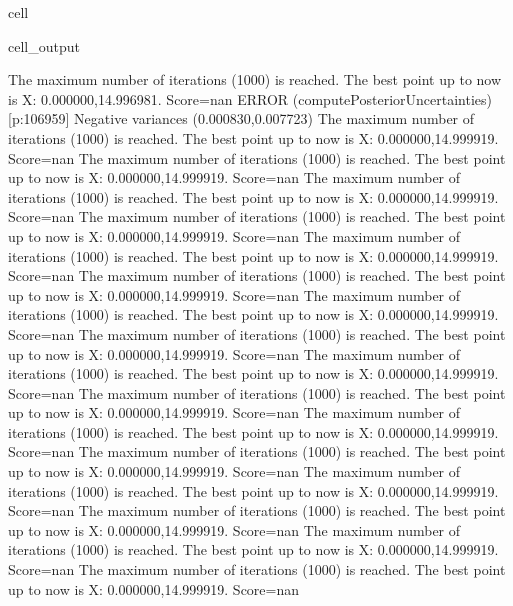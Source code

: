 \documentclass[letterpaper,10pt,english]{jupyterBook}
\begin{document}
\begin{sphinxuseclass}{cell}
\begin{sphinxVerbatimOutput}
\begin{sphinxuseclass}{cell_output}
\begin{sphinxVerbatim}[commandchars=\\\{\}]
The maximum number of iterations (1000) is reached. The best point up to now is X: \PYGZob{}0.000000,14.996981\PYGZcb{}. Score=\PYGZhy{}nan
ERROR (compute\PYGZus{}Posterior\PYGZus{}Uncertainties) [p:106959] Negative variances (\PYGZhy{}0.000830,0.007723)
The maximum number of iterations (1000) is reached. The best point up to now is X: \PYGZob{}0.000000,14.999919\PYGZcb{}. Score=\PYGZhy{}nan
The maximum number of iterations (1000) is reached. The best point up to now is X: \PYGZob{}0.000000,14.999919\PYGZcb{}. Score=\PYGZhy{}nan
The maximum number of iterations (1000) is reached. The best point up to now is X: \PYGZob{}0.000000,14.999919\PYGZcb{}. Score=\PYGZhy{}nan
The maximum number of iterations (1000) is reached. The best point up to now is X: \PYGZob{}0.000000,14.999919\PYGZcb{}. Score=\PYGZhy{}nan
The maximum number of iterations (1000) is reached. The best point up to now is X: \PYGZob{}0.000000,14.999919\PYGZcb{}. Score=\PYGZhy{}nan
The maximum number of iterations (1000) is reached. The best point up to now is X: \PYGZob{}0.000000,14.999919\PYGZcb{}. Score=\PYGZhy{}nan
The maximum number of iterations (1000) is reached. The best point up to now is X: \PYGZob{}0.000000,14.999919\PYGZcb{}. Score=\PYGZhy{}nan
The maximum number of iterations (1000) is reached. The best point up to now is X: \PYGZob{}0.000000,14.999919\PYGZcb{}. Score=\PYGZhy{}nan
The maximum number of iterations (1000) is reached. The best point up to now is X: \PYGZob{}0.000000,14.999919\PYGZcb{}. Score=\PYGZhy{}nan
The maximum number of iterations (1000) is reached. The best point up to now is X: \PYGZob{}0.000000,14.999919\PYGZcb{}. Score=\PYGZhy{}nan
The maximum number of iterations (1000) is reached. The best point up to now is X: \PYGZob{}0.000000,14.999919\PYGZcb{}. Score=\PYGZhy{}nan
The maximum number of iterations (1000) is reached. The best point up to now is X: \PYGZob{}0.000000,14.999919\PYGZcb{}. Score=\PYGZhy{}nan
The maximum number of iterations (1000) is reached. The best point up to now is X: \PYGZob{}0.000000,14.999919\PYGZcb{}. Score=\PYGZhy{}nan
The maximum number of iterations (1000) is reached. The best point up to now is X: \PYGZob{}0.000000,14.999919\PYGZcb{}. Score=\PYGZhy{}nan
The maximum number of iterations (1000) is reached. The best point up to now is X: \PYGZob{}0.000000,14.999919\PYGZcb{}. Score=\PYGZhy{}nan
The maximum number of iterations (1000) is reached. The best point up to now is X: \PYGZob{}0.000000,14.999919\PYGZcb{}. Score=\PYGZhy{}nan

\end{sphinxVerbatim}
\end{sphinxuseclass}
\end{sphinxVerbatimOutput}
\end{sphinxuseclass}
\end{document}
